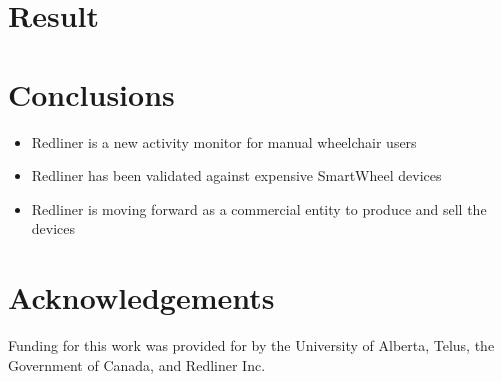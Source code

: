 \documentclass[a0,landscape]{a0poster}
\begin{document}
\begin{multicols*}{3}
\section*{Result}

\section*{Conclusions}
\begin{itemize}
    \item Redliner is a new activity monitor for manual wheelchair users
    \item Redliner has been validated against expensive SmartWheel devices
    \item Redliner is moving forward as a commercial entity to produce and sell the devices
\end{itemize}

\nocite{*} %

\section*{Acknowledgements}
Funding for this work was provided for by the University of Alberta, Telus, the Government of Canada, and Redliner Inc.

\end{multicols*}
\end{document}
